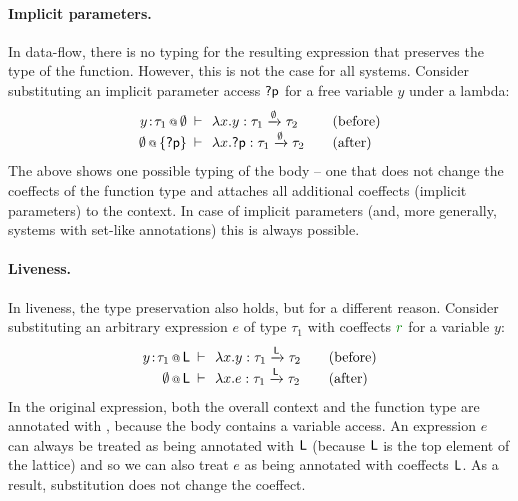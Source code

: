 \paragraph{Implicit parameters.} In data-flow, there is no typing for the resulting expression that
preserves the type of the function. However, this is not the case for all systems. Consider substituting
an implicit parameter access $\textnormal{\sffamily ?p}$ for a free variable $y$ under a lambda:
%
\begin{equation*}
\begin{array}{rclcl}
 \coctx{y\!:\!\tau_1}{\emptyset} &\narrow{\vdash}& \lambda x.y : \tau_1 \xrightarrow{\emptyset} \tau_2 & & (\textnormal{before}) \\
 \coctx{\emptyset}{ \{\ident{?p}\} } &\narrow{\vdash}& \lambda x.\ident{?p} : \tau_1 \xrightarrow{\emptyset} \tau_2 & & (\textnormal{after}) \\
\end{array}
\end{equation*}
%
The above shows one possible typing of the body -- one that does not change the coeffects of the 
function type and attaches all additional coeffects (implicit parameters) to the context. In case
of implicit parameters (and, more generally, systems with set-like annotations) this is always 
possible. 

\paragraph{Liveness.} In liveness, the type preservation also holds, but for a different reason. Consider
substituting an arbitrary expression $e$ of type $\tau_1$ with coeffects $\cclrd{r}$ for a variable $y$:
%
\begin{equation*}
\begin{array}{rclcl}
 \coctx{y\!:\!\tau_1}{\ident{L}} &\narrow{\vdash}& \lambda x.y : \tau_1 \xrightarrow{\ident{L}} \tau_2 & & (\textnormal{before}) \\
 \coctx{\emptyset}{\ident{L}} &\narrow{\vdash}& \lambda x.e : \tau_1 \xrightarrow{\ident{L}} \tau_2 & & (\textnormal{after}) \\
\end{array}
\end{equation*}
%
In the original expression, both the overall context and the function type are annotated with , 
because the body contains a variable access. An expression $e$ can always be treated as being annotated
with $\textnormal{\sffamily L}$ (because $\textnormal{\sffamily L}$ is the top element of the lattice) and so we can also treat $e$
as being annotated with coeffects $\textnormal{\sffamily L}$. As a result, substitution does not change the coeffect.

